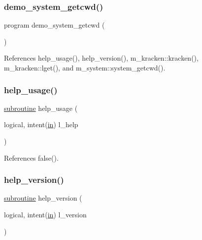 \subsubsection{\texorpdfstring{demo\+\_\+system\+\_\+getcwd()}{demo\_system\_getcwd()}}
{\footnotesize\ttfamily program demo\+\_\+system\+\_\+getcwd (\begin{DoxyParamCaption}{ }\end{DoxyParamCaption})}



References help\+\_\+usage(), help\+\_\+version(), m\+\_\+kracken\+::kracken(), m\+\_\+kracken\+::lget(), and m\+\_\+system\+::system\+\_\+getcwd().

\mbox{\label{__pwd_8f90_a3e09a3b52ee8fb04eeb93fe5761626a8}} 
\subsubsection{\texorpdfstring{help\+\_\+usage()}{help\_usage()}}
{\footnotesize\ttfamily \hyperlink{M__stopwatch_83_8txt_acfbcff50169d691ff02d4a123ed70482}{subroutine} help\+\_\+usage (\begin{DoxyParamCaption}\item[{logical, intent(\hyperlink{M__journal_83_8txt_afce72651d1eed785a2132bee863b2f38}{in})}]{l\+\_\+help }\end{DoxyParamCaption})}



References false().

\mbox{\label{__pwd_8f90_a39c21619b08a3c22f19e2306efd7f766}} 
\subsubsection{\texorpdfstring{help\+\_\+version()}{help\_version()}}
{\footnotesize\ttfamily \hyperlink{M__stopwatch_83_8txt_acfbcff50169d691ff02d4a123ed70482}{subroutine} help\+\_\+version (\begin{DoxyParamCaption}\item[{logical, intent(\hyperlink{M__journal_83_8txt_afce72651d1eed785a2132bee863b2f38}{in})}]{l\+\_\+version }\end{DoxyParamCaption})}



